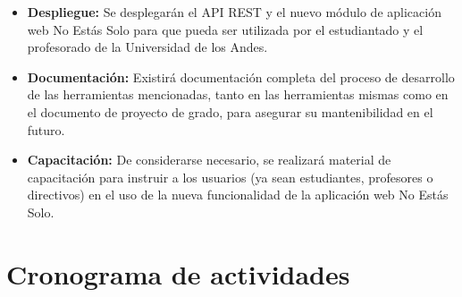 \documentclass{fmbproyectogrado}
\begin{document}
\begin{itemize}
  \item \textbf{Despliegue:} Se desplegarán el API REST y el nuevo módulo de aplicación web No Estás Solo para que pueda ser utilizada por el estudiantado y el profesorado de la Universidad de los Andes.
  \item \textbf{Documentación:} Existirá documentación completa del proceso de desarrollo de las herramientas mencionadas, tanto en las herramientas mismas como en el documento de proyecto de grado, para asegurar su mantenibilidad en el futuro.
  \item \textbf{Capacitación:} De considerarse necesario, se realizará material de capacitación para instruir a los usuarios (ya sean estudiantes, profesores o directivos) en el uso de la nueva funcionalidad de la aplicación web No Estás Solo.
\end{itemize}

\section{Cronograma de actividades}
\end{document}
